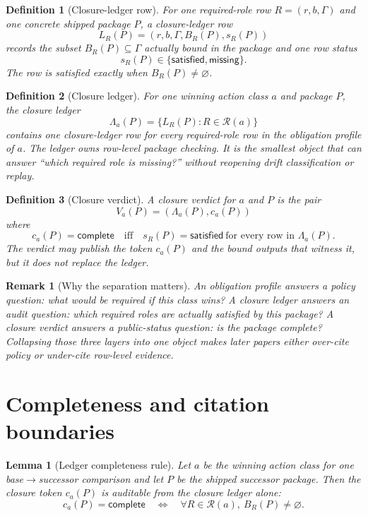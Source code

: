 \documentclass[11pt]{article}
\newtheorem{definition}{Definition}
\newtheorem{lemma}{Lemma}
\newtheorem{remark}{Remark}
\begin{document}
\begin{definition}[Closure-ledger row]
For one required-role row $R=(r,b,\Gamma)$ and one concrete shipped package $P$, a \emph{closure-ledger row}
\[
L_R(P)=(r,b,\Gamma,B_R(P),s_R(P))
\]
records the subset $B_R(P)\subseteq \Gamma$ actually bound in the package and one row status
\[
s_R(P)\in\{\textsf{satisfied},\textsf{missing}\}.
\]
The row is satisfied exactly when $B_R(P)\neq \varnothing$.
\end{definition}

\begin{definition}[Closure ledger]
For one winning action class $a$ and package $P$, the \emph{closure ledger}
\[
\Lambda_a(P)=\{L_R(P): R \in \mathcal R(a)\}
\]
contains one closure-ledger row for every required-role row in the obligation profile of $a$.
The ledger owns row-level package checking.
It is the smallest object that can answer ``which required role is missing?'' without reopening drift classification or replay.
\end{definition}

\begin{definition}[Closure verdict]
A \emph{closure verdict} for $a$ and $P$ is the pair
\[
V_a(P)=(\Lambda_a(P), c_a(P))
\]
where
\[
c_a(P)=\textsf{complete}
\quad\text{iff}\quad
s_R(P)=\textsf{satisfied}\ \text{for every row in }\Lambda_a(P).
\]
The verdict may publish the token $c_a(P)$ and the bound outputs that witness it, but it does not replace the ledger.
\end{definition}

\begin{remark}[Why the separation matters]
An obligation profile answers a policy question: \emph{what would be required if this class wins?}
A closure ledger answers an audit question: \emph{which required roles are actually satisfied by this package?}
A closure verdict answers a public-status question: \emph{is the package complete?}
Collapsing those three layers into one object makes later papers either over-cite policy or under-cite row-level evidence.
\end{remark}

\section{Completeness and citation boundaries}

\begin{lemma}[Ledger completeness rule]
Let $a$ be the winning action class for one base$\to$successor comparison and let $P$ be the shipped successor package.
Then the closure token $c_a(P)$ is auditable from the closure ledger alone:
\[
c_a(P)=\textsf{complete}
\quad\Longleftrightarrow\quad
\forall R\in\mathcal R(a),\ B_R(P)\neq\varnothing.
\]
\end{lemma}
\end{document}
